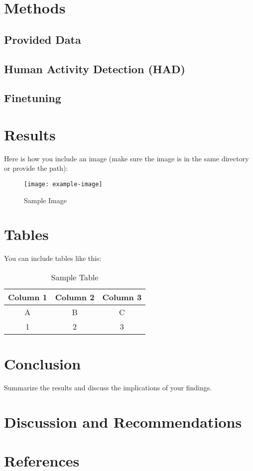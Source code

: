 \documentclass[a4paper,12pt]{article}
\begin{document}
\section{Methods}

\subsection{Provided Data}
\subsection{Human Activity Detection (HAD)}
\subsection{Finetuning}


\section{Results}
Here is how you include an image (make sure the image is in the same directory or provide the path):

\begin{figure}[H]
    \centering
    \texttt{[image: example-image]} %
    \caption{Sample Image}
    \label{fig:sample-image}
\end{figure}

\section{Tables}
You can include tables like this:

\begin{table}[H]
    \centering
    \begin{tabular}{|c|c|c|}
        \hline
        Column 1 & Column 2 & Column 3 \\
        \hline
        A & B & C \\
        1 & 2 & 3 \\
        \hline
    \end{tabular}
    \caption{Sample Table}
    \label{tab:sample-table}
\end{table}

\section{Conclusion}
Summarize the results and discuss the implications of your findings.

\section{Discussion and Recommendations}

\section*{References}
\end{document}
